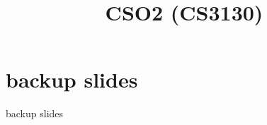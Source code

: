 \date{}
\title{CSO2 (CS3130)}

\begin{frame}
\titlepage{}
\end{frame}




\section{backup slides}
\begin{frame}{backup slides}
\end{frame}


